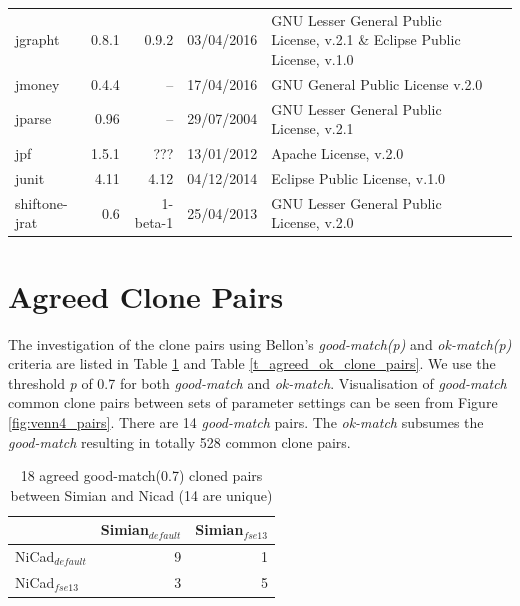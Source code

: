 \documentclass{IEEEtran}
\begin{document}
\begin{table}[H]
\begin{tabular}{l|r|r|c|p{5cm}|p{3cm}}
	jgrapht & 0.8.1 & 0.9.2 & 03/04/2016 & GNU Lesser General Public License, v.2.1 \& Eclipse Public License, v.1.0 & \\
	jmoney & 0.4.4 & -- & 17/04/2016 & GNU General Public License v.2.0 &  \\
	jparse & 0.96 & -- & 29/07/2004 & GNU Lesser General Public License, v.2.1 & \\
	jpf & 1.5.1 & ??? & 13/01/2012 & Apache License, v.2.0 & \\
	junit & 4.11 & 4.12 & 04/12/2014 & Eclipse Public License, v.1.0 & \\
	shiftone-jrat & 0.6 & 1-beta-1 & 25/04/2013 & GNU Lesser General Public License, v.2.0 &  \\
	\hline 
\end{tabular} 
\end{table}

\section*{Agreed Clone Pairs}
The investigation of the clone pairs using Bellon's \textit{good-match(p)} and \textit{ok-match(p)} criteria are listed in  Table \ref{t_agreed_good_clone_pairs} and Table \ref{t_agreed_ok_clone_pairs}. We use the threshold \textit{p} of 0.7 for both \textit{good-match} and \textit{ok-match}. Visualisation of \textit{good-match} common clone pairs between sets of parameter settings can be seen from Figure \ref{fig:venn4_pairs}. There are 14 \textit{good-match} pairs. The \textit{ok-match} subsumes the \textit{good-match} resulting in totally 528 common clone pairs.

\begin{table}[h]
	\centering
	\caption{18 agreed good-match(0.7) cloned pairs between Simian and Nicad (14 are unique)}
	\label{t_agreed_good_clone_pairs}
	\begin{tabular}{l|r|r}
		\hline
		& Simian$_{\mathrm{\textit{default}}}$ & Simian$_{\mathrm{\textit{fse13}}}$ \\ %
		\hline
		NiCad$_{\mathrm{\textit{default}}}$ & 9 & 1 \\ %
		NiCad$_{\mathrm{\textit{fse13}}}$   & 3 & 5 \\ %
		\hline
	\end{tabular}
\end{table}
\end{document}
